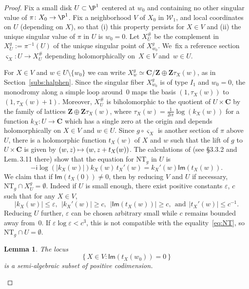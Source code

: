 \documentclass[JEP,XML,SOM,Unicode,published]{cedram}
\newcommand\mto{\mathchoice{\longmapsto}{\mapsto}{\mapsto}{\mapsto}}
\let\sep :
\let\e\varepsilon
\newcommand{\set}[1]{\left\{#1\right\}}
\newcommand{\abs}[1]{\left\vert#1\right\vert}
\newcommand{\unsur}[1]{\frac{1}{#1}}
\newcommand{\inv}{^{-1}}
\def\C{\mathbf{C}}
\def\Z{\mathbf{Z}}
\newcommand{\cW}{\mathcal{W}}
\newcommand\ii{{\mathsf{i}}}
\newcommand{\Ima}{{\mathsf{Im}}}
\theoremstyle{plain}
\newtheorem{lem}[thm]{Lemma}
\theoremstyle{definition}
\begin{document}
\begin{proof}
Fix a small disk $U\subset \P^1$ centered at $w_0$ and containing no other singular value of $\pi\colon X_0\to \P^1$.
Fix a neighborhood $V$ of $X_0$ in $ \cW_1$, and local coordinates on $U$ (depending on $X$), so that (i) this property persists for $X\in V$ and (ii) the unique singular value of $\pi$ in $U$ is $w_0=0$. Let
$X^\#_U $ be the complement in $X_U^g:=\pi\inv(U)$ of the unique singular point of $X_{w_0}^g$. We~fix a reference section $\varsigma_X:U\to X^\#_U$ depending holomorphically on~$X\in V$ and~$w\in U$.

For $X\in V$ and $w\in U\setminus\{w_0\}$ we can write
$X_w^g\simeq \C/\Z\oplus \Z\tau_X(w)$, as in Section~\ref{subs:halphen}. Since the singular fiber $X_{w_0}^g$ is of type $I_1$ and $w_0=0$, the monodromy along a simple loop around~$0$ maps the basis $(1, \tau_X(w))$ to $(1, \tau_X(w)+1)$. Moreover,
$X^\#_U$ is biholomorphic to the quotient of $U\times \C$ by the family of lattices
$\Z\oplus \Z\tau_X(w)$, where $\tau_X(w) = \unsur{2\ii \pi} \log (k_X(w))$ for a function $k_X\colon U\to \C$ which has a single zero at the origin and depends holomorphically on $X\in V$ and $w\in U$.
Since
$g\circ \varsigma_X$ is another section of $\pi$ above $U$, there is a holomorphic function $t_X(w)$
of $X$ and $w$ such that the lift of $g$ to $U\times \C$ is given by $(w, z)\mto (w, z+ t_X(w))$.
The calculations of \cite{invariant}
(see \S 3.3.2 and Lem.\,3.11 there) show that the equation for $\mathrm{NT}_g$ in $U$ is
\begin{equation}\label{eq:NT}
- \ii \log(\abs{k_X(w)}) k_X(w) \, t_X'(w) = k_X'(w) \Ima(t_X(w)).
\end{equation}
We claim that if $\Ima(t_X(0)) \neq 0$, then by reducing $V$ and $U$ if necessary,
$\mathrm{NT}_g\cap X_U^g = \emptyset$. Indeed if $U$ is small enough,
there exist positive constants $\e$, $c$ such that for any $X\in V$,
\begin{equation*}
\abs{k_X(w)}\leq \e, \;\, \abs{k_X'(w)}\geq c, \;\,
\abs{\Ima(t_X(w))}\geq c, \;\, {\text{and}} \;\, \abs{t_X'(w)}\leq c\inv.
\end{equation*}
Reducing $U$ further,
$\e$ can be chosen arbitrary small while
$c$ remains bounded away from~$0$. If $\e\log\e < c^3$, this is not
compatible with the equality~\eqref{eq:NT}, so $\mathrm{NT}_g\cap U = \emptyset$.

\begin{lem}\label{lem:twisting_singular}
The locus
\begin{equation}\label{eq:analytic_equation}
\set{X\in V\sep \Ima(t_X(w_0)) = 0}
\end{equation}
is a semi-algebraic subset of positive codimension.
\end{lem}


\end{proof}
\end{document}
